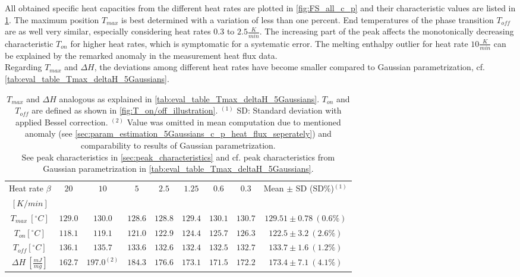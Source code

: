 \documentclass{scrartcl}[12pt, halfparskip]
\numberwithin{equation}{section}
\numberwithin{figure}{section}
\numberwithin{table}{section}
\begin{document}
All obtained specific heat capacities from the different heat rates are plotted in \cref{fig:FS_all_c_p} and their characteristic values are listed in \cref{tab:eval_table_Tmax_deltaH_FS}. The maximum position $T_{max}$ is best determined with a variation of less than one percent. End temperatures of the phase transition $T_{off}$ are as well very similar, especially considering heat rates $0.3$ to $2.5 \frac{K}{min}$. The increasing part of the peak affects the monotonically decreasing characteristic $T_{on}$ for higher heat rates, which is symptomatic for a systematic error. The melting enthalpy outlier for heat rate $10 \frac{K}{min}$ can be explained by the remarked anomaly in the measurement heat flux data. \\
Regarding $T_{max}$ and $\Delta H$, the deviations among different heat rates have become smaller compared to Gaussian parametrization, cf. \cref{tab:eval_table_Tmax_deltaH_5Gaussians}.


\begin{table}[H]
	\centering
	\caption{$T_{max}$ and $\Delta H$ analogous as explained in \cref{tab:eval_table_Tmax_deltaH_5Gaussians}. $T_{on}$ and $T_{off}$ are defined as shown in \cref{fig:T_on/off_illustration}. 
	$^{(1)}$ SD: Standard deviation with applied Bessel correction. 
	$^{(2)}$ Value was omitted in mean computation due to mentioned anomaly (see \cref{sec:param_estimation_5Gaussians_c_p_heat_flux_seperately}) and comparability to results of Gaussian parametrization. \\
	See peak characteristics in \cref{sec:peak_characteristics} and cf. peak characteristics from Gaussian parametrization in \cref{tab:eval_table_Tmax_deltaH_5Gaussians}.}
	\begin{tabular}{| c | c | c | c | c | c | c | c || c |} \hline
		Heat rate $\beta$ & $20$ & $10$ & $5$ & $2.5$ & $1.25$ & $0.6$ & $0.3$ & Mean $\pm$ SD (SD\%)$^{(1)}$ \\
		$[K/min]$ & & & & & & & & \\ \hline
		$T_{max} \ [^{\circ}C]$ & $129.0$ & $130.0$ & $128.6$ & $128.8$ & $129.4$ & $130.1$ & $130.7$ & $129.51 \pm 0.78 \ (0.6\%)$ \\[0.7ex]
		$T_{on} [^{\circ} C]$ & $118.1$ & $119.1$ & $121.0$ & $122.9$ & $124.4$ & $125.7$ & $126.3$ & $122.5 \pm 3.2 \ (2.6\%)$ \\[0.7ex]
		$T_{off} [^{\circ} C]$ & $136.1$ & $135.7$ & $133.6$ & $132.6$ & $132.4$ & $132.5$ & $132.7$ & $133.7 \pm 1.6 \ (1.2\%)$ \\[0.7ex]
		$\Delta H \ [\frac{mJ}{mg}]$ & $162.7$ & $197.0^{(2)}$ & $184.3$ & $176.6$ & $173.1$ & $171.5$ & $172.2$ & $173.4 \pm 7.1 \ (4.1\%)$ \\ \hline
	\end{tabular}
	\label{tab:eval_table_Tmax_deltaH_FS}
\end{table}
\end{document}
